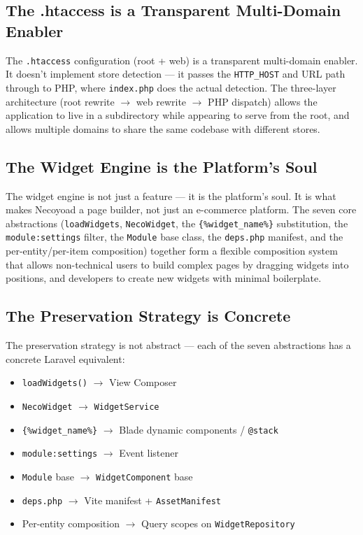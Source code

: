 \documentclass[11pt,a4paper]{article}
\begin{document}
\subsection{The .htaccess is a Transparent Multi-Domain Enabler}

The \texttt{.htaccess} configuration (root + web) is a transparent
multi-domain enabler. It doesn't implement store detection --- it
passes the \texttt{HTTP\_HOST} and URL path through to PHP, where
\texttt{index.php} does the actual detection. The three-layer
architecture (root rewrite $\to$ web rewrite $\to$ PHP dispatch) allows
the application to live in a subdirectory while appearing to serve
from the root, and allows multiple domains to share the same codebase
with different stores.

\subsection{The Widget Engine is the Platform's Soul}

The widget engine is not just a feature --- it is the platform's soul.
It is what makes Necoyoad a page builder, not just an e-commerce
platform. The seven core abstractions
(\texttt{loadWidgets}, \texttt{NecoWidget}, the
\texttt{\{\%widget\_name\%\}} substitution, the
\texttt{module:settings} filter, the \texttt{Module} base class, the
\texttt{deps.php} manifest, and the per-entity/per-item composition)
together form a flexible composition system that allows
non-technical users to build complex pages by dragging widgets into
positions, and developers to create new widgets with minimal
boilerplate.

\subsection{The Preservation Strategy is Concrete}

The preservation strategy is not abstract --- each of the seven
abstractions has a concrete Laravel equivalent:
\begin{itemize}[leftmargin=1.6em,itemsep=2pt]
  \item \texttt{loadWidgets()} $\to$ View Composer
  \item \texttt{NecoWidget} $\to$ \texttt{WidgetService}
  \item \texttt{\{\%widget\_name\%\}} $\to$ Blade dynamic components /
        \texttt{@stack}
  \item \texttt{module:settings} $\to$ Event listener
  \item \texttt{Module} base $\to$ \texttt{WidgetComponent} base
  \item \texttt{deps.php} $\to$ Vite manifest + \texttt{AssetManifest}
  \item Per-entity composition $\to$ Query scopes on
        \texttt{WidgetRepository}
\end{itemize}
\end{document}
